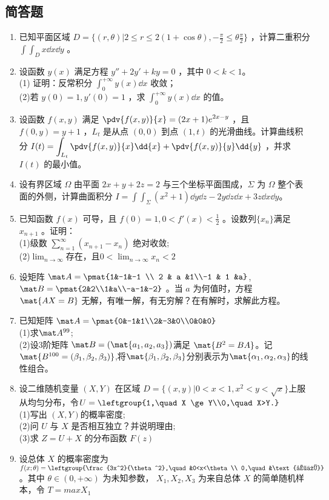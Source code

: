 \subsection{简答题}
\begin{enumerate}
\item 已知平面区域 $\displaystyle D=\{(r,\theta)|2 \le r \le 2(1+\cos \theta),-\frac{\pi}{2} \le \theta \frac{\pi}{2}\}$  ，计算二重积分 $\displaystyle \int\int_D x\dd{x}\dd{y}$ 。
\item 设函数 $y(x)$ 满足方程 $y''+2y'+ky=0$ ，其中 $0<k<1$。\\
(1) 证明：反常积分  $\displaystyle \int_0^{+\infty} y(x)\dd{x}$ 收敛；\\
(2)若 $y(0)=1,y'(0)=1$  ，求 $\displaystyle \int_0^{+\infty} y(x)\dd{x}$ 的值。
\item 设函数 $f(x,y)$ 满足 $\displaystyle \pdv{f(x,y)}{x}=(2x+1)e^{2x-y}$ ，且 $f(0,y)=y+1$  ，$L_t$ 是从点 $(0,0)$ 到点 $(1,t)$ 的光滑曲线。计算曲线积分 $\displaystyle I(t)=\int_{L_t}\pdv{f(x,y)}{x}\dd{x}+\pdv{f(x,y)}{y}\dd{y}$ ，并求 $I(t)$ 的最小值。
\item 设有界区域 $\Omega$ 由平面 $2x+y+2z=2$ 与三个坐标平面围成，$\Sigma$  为 $\Omega$ 整个表面的外侧，计算曲面积分 $\displaystyle I=\int\int_\Sigma (x^2+1)\dd{y}\dd{z}-2y\dd{z}\dd{x}+3z\dd{x}\dd{y}$。
\item 已知函数 $f(x)$ 可导，且 $f(0)=1,0<f'(x)<\frac{1}{2}$ 。设数列$\{{x_n}\}$满足 $x_{n+1}$ 。证明：\\
(1)级数 $\displaystyle \sum_{n=1}^\infty(x_{n+1}-x_n)$ 绝对收敛;\\
(2)$\displaystyle \lim_{n \to \infty}$存在，且$\displaystyle 0<\lim_{n \to \infty}x_n<2$
\item 设矩阵 $\mat A=\pmat{1&-1&-1 \\ 2 & a &1\\-1 & 1 &a}$,$\mat B=\pmat{2&2\\1&a\\-a-1&-2}$  。当 $a$ 为何值时，方程 $\mat{AX=B}$ 无解，有唯一解，有无穷解？在有解时，求解此方程。
\item 已知矩阵 $\mat A=\pmat{0&-1&1\\2&-3&0\\0&0&0}$\\
(1)求$\mat A^{99}$;\\
(2)设3阶矩阵 $\mat B=(\mat{a_1,a_2,a_3})$满足 $\mat {B^2=BA}$。记 $\mat {B^{100}=(\beta_1,\beta_2,\beta_3)}$,将$\mat{\beta_1,\beta_2,\beta_3}$分别表示为$\mat{\alpha_1,\alpha_2,\alpha_3}$的线性组合。
\item 设二维随机变量 $(X,Y)$ 在区域  $D=\{(x,y)|0<x<1,x^2<y<\sqrt{x}\}$上服从均匀分布，令$U=\leftgroup{1,\quad X  \ge Y\\0,\quad X>Y.}$\\
(1)写出 $(X,Y) $的概率密度;\\
(2)问 $U$ 与 $X$ 是否相互独立？并说明理由;\\
(3)求 $Z=U+X$ 的分布函数 $F(z)$
\item 设总体 $X$ 的概率密度为 $f(x;\theta)=\leftgroup{\frac{3x^2}{\theta^2},\quad&0<x<\theta\\ 0,\quad&\text{其他}}$ 。其中 $\theta \in (0,+\infty)$ 为未知参数， $X_1,X_2,X_3$ 为来自总体 $X$ 的简单随机样本，令  $T=max{X_1}$
\end{enumerate}
